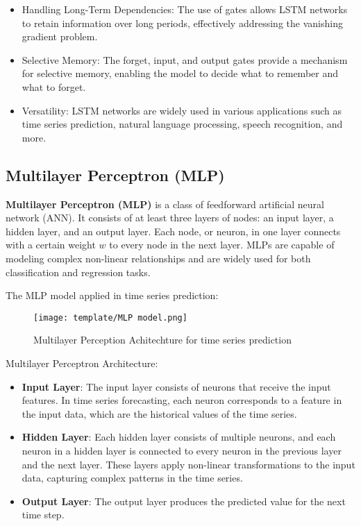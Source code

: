 \documentclass{ieeeojies}
\begin{document}
\begin{itemize}
\item Handling Long-Term Dependencies: The use of gates allows LSTM networks to retain information over long periods, effectively addressing the vanishing gradient problem.
\item Selective Memory: The forget, input, and output gates provide a mechanism for selective memory, enabling the model to decide what to remember and what to forget.
\item Versatility: LSTM networks are widely used in various applications such as time series prediction, natural language processing, speech recognition, and more.
\end{itemize}

\subsection{Multilayer Perceptron (MLP)}
\textbf{Multilayer Perceptron (MLP)}  is a class of feedforward artificial neural network (ANN). It consists of at least three layers of nodes: an input layer, a hidden layer, and an output layer. Each node, or neuron, in one layer connects with a certain weight \(w\) to every node in the next layer. MLPs are capable of modeling complex non-linear relationships and are widely used for both classification and regression tasks.

The MLP model applied in time series prediction:
\begin{figure}[H]
  \centering
  \begin{minipage}{0.8\linewidth}
    \centering
    \texttt{[image: template/MLP model.png]}
    \caption{Multilayer Perception Achitechture for time series prediction \cite{b2}}
    \label{fig8}
  \end{minipage}
\end{figure}

Multilayer Perceptron Architecture:
\begin{itemize}
\item \textbf{Input Layer}: The input layer consists of neurons that receive the input features. In time series forecasting, each neuron corresponds to a feature in the input data, which are the historical values of the time series.
\item \textbf{Hidden Layer}: Each hidden layer consists of multiple neurons, and each neuron in a hidden layer is connected to every neuron in the previous layer and the next layer. These layers apply non-linear transformations to the input data, capturing complex patterns in the time series.
\item \textbf{Output Layer}: The output layer produces the predicted value for the next time step.
\end{itemize}
\end{document}
